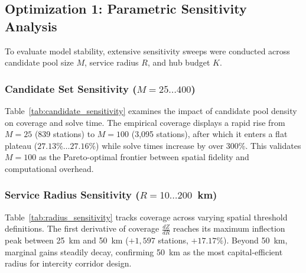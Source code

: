 \documentclass[conference]{IEEEtran}
\begin{document}
\subsection{Optimization 1: Parametric Sensitivity Analysis}
To evaluate model stability, extensive sensitivity sweeps were conducted across candidate pool size $M$, service radius $R$, and hub budget $K$.

\subsubsection{Candidate Set Sensitivity ($M = 25 \dots 400$)}
Table~\ref{tab:candidate_sensitivity} examines the impact of candidate pool density on coverage and solve time. The empirical coverage displays a rapid rise from $M = 25$ (839 stations) to $M = 100$ (3,095 stations), after which it enters a flat plateau ($27.13\% \dots 27.16\%$) while solve times increase by over 300\%. This validates $M = 100$ as the Pareto-optimal frontier between spatial fidelity and computational overhead.

\begin{table}[H]
\caption{Candidate Hub Pool Sensitivity ($K=10, R=50\text{ km}$)}
\label{tab:candidate_sensitivity}
\centering
{}
\end{table}

\subsubsection{Service Radius Sensitivity ($R = 10 \dots 200$~km)}
Table~\ref{tab:radius_sensitivity} tracks coverage across varying spatial threshold definitions. The first derivative of coverage $\frac{dZ}{dR}$ reaches its maximum inflection peak between 25~km and 50~km ($+1,597$ stations, $+17.17\%$). Beyond 50~km, marginal gains steadily decay, confirming 50~km as the most capital-efficient radius for intercity corridor design.
\end{document}
